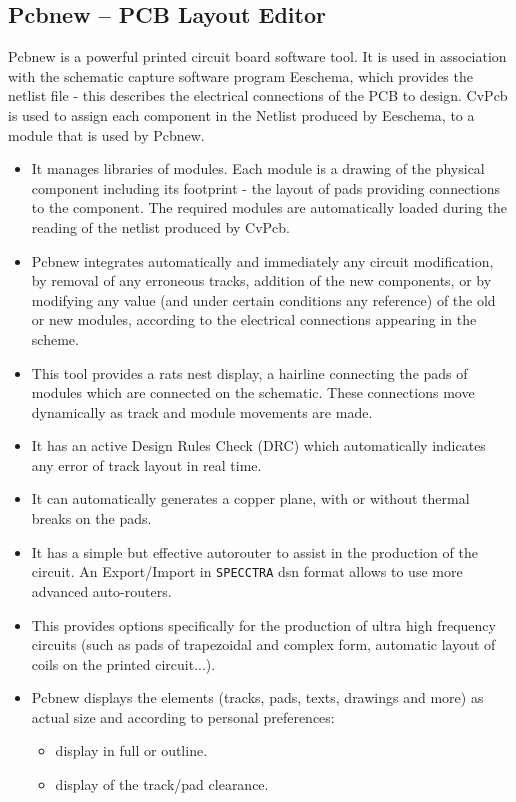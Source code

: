 \subsection {Pcbnew -- PCB Layout Editor}
Pcbnew is a powerful printed circuit board software tool. It is used in association with the schematic capture software program Eeschema, which provides the netlist file - this describes the electrical connections of the PCB to design. CvPcb is used to assign each component in the Netlist produced by Eeschema, to a module that is used by Pcbnew.
\begin{itemize}
\item It manages libraries of modules. Each module is a drawing of the physical component including its footprint - the layout of pads providing connections to the component. The required modules are automatically loaded during the reading of the netlist produced by CvPcb.
\item Pcbnew integrates automatically and immediately any circuit modification, by removal of any erroneous tracks, addition of the new components, or by modifying any value (and under certain conditions any reference) of the old or new modules, according to the electrical connections appearing in the scheme.  
\item This tool provides a rats nest display, a hairline connecting the pads of modules which are connected on the schematic. These connections move dynamically as track and module movements are made.
\item It has an active Design Rules Check (DRC) which automatically indicates any error of track layout in real time.
\item It can automatically generates a copper plane, with or without thermal breaks on the pads. 
\item It has a simple but effective autorouter to assist in the production of the circuit. An Export/Import in {\tt SPECCTRA} dsn format allows to use more advanced auto-routers. 
\item This provides options specifically for the production of ultra high frequency circuits (such as pads of trapezoidal and complex form, automatic layout of coils on the printed circuit...). 
\item Pcbnew displays the elements (tracks, pads, texts, drawings and more) as actual size and according to personal preferences:
\begin{itemize}
\item display in full or outline.
\item display of the track/pad clearance.
\end{itemize}
\end{itemize}

